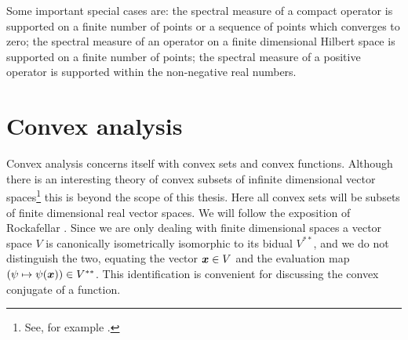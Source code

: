 Some important special cases are: the spectral measure of a compact operator is supported on a finite number of points or a sequence of points which converges to zero; the spectral measure of an operator on a finite dimensional Hilbert space is supported on a finite number of points; the spectral measure of a positive operator is supported within the non-negative real numbers.

\section{Convex analysis}
\label{sec:prelim-comvex-analysis}
Convex analysis concerns itself with convex sets and convex functions. Although there is an interesting theory of convex subsets of infinite dimensional vector spaces\footnote{See, for example \cite{10.1007/978-1-84800-155-8_12}.} this is beyond the scope of this thesis. Here all convex sets will be subsets of finite dimensional real vector spaces. We will follow the exposition of Rockafellar \cite{rtr-conv-anal-book}. Since we are only dealing with finite dimensional spaces a vector space $V$ is canonically isometrically isomorphic to its bidual $V^{**}$, and we do not distinguish the two, equating the vector $\bm{x}\in V$ and the evaluation map $(\psi\mapsto\psi(\bm{x}))\in V^{**}$. This identification is convenient for discussing the convex conjugate of a function.

